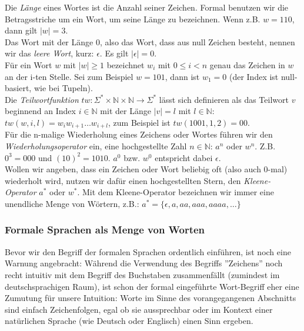 \noindent
Die \emph{Länge} eines Wortes ist die Anzahl seiner Zeichen.
Formal benutzen wir die Betragsstriche um ein Wort, um seine
Länge zu bezeichnen. Wenn z.B. $w = 110$, dann gilt $|w| = 3$.\\

\noindent
Das Wort mit der Länge 0, also das Wort, dass aus null Zeichen besteht,
nennen wir das \emph{leere Wort}, kurz: $\epsilon$.
Es gilt $|\epsilon| = 0$.\\

\noindent
Für ein Wort $w$ mit $|w| \geq 1$ bezeichnet $w_i$ mit $0 \leq i < n$
genau das Zeichen in $w$ an der i-ten Stelle.
Sei zum Beispiel $w = 101$, dann ist $w_1 = 0$
(der Index ist null-basiert, wie bei Tupeln).\\

\noindent
Die \emph{Teilwortfunktion}
$tw: \Sigma^* \times \mathbb{N} \times \mathbb{N} \rightarrow \Sigma^*$
lässt sich definieren als das Teilwort $v$ beginnend an Index $i \in \mathbb{N}$
mit der Länge $|v| = l$ mit $l \in \mathbb{N}$:
$tw(w, i, l) = w_iw_{i+1}\ldots{}w_{i+l}$,
zum Beispiel ist $tw(1001, 1, 2) = 00$.\\

\noindent
Für die n-malige Wiederholung eines Zeichens oder Wortes führen wir den \emph{Wiederholungsoperator}
ein, eine hochgestellte Zahl $n \in \mathbb{N}$: $a^n$ oder $w^n$.
Z.B. $0^3 = 000$ und $(10)^2 = 1010$.
$a^0$ bzw. $w^0$ entspricht dabei $\epsilon$.\\

\noindent
Wollen wir angeben, dass ein Zeichen oder Wort beliebig oft (also auch 0-mal) wiederholt
wird, nutzen wir dafür einen hochgestellten Stern, den \emph{Kleene-Operator} $a^*$ oder $w^*$.
Mit dem Kleene-Operator bezeichnen wir immer eine unendliche Menge von Wörtern, z.B.:
$a^* = \{\epsilon, a, aa, aaa, aaaa, \dots\}$

\subsubsection{Formale Sprachen als Menge von Worten}

Bevor wir den Begriff der formalen Sprachen ordentlich einführen,
ist noch eine Warnung angebracht:
Während die Verwendung des Begriffs ''Zeichens''
noch recht intuitiv mit dem Begriff des Buchstaben zusammenfällt
(zumindest im deutschsprachigen Raum),
ist schon der formal eingeführte Wort-Begriff eher eine Zumutung für unsere Intuition:
Worte im Sinne des vorangegangenen Abschnitts sind einfach Zeichenfolgen,
egal ob sie aussprechbar oder im Kontext einer natürlichen Sprache
(wie Deutsch oder Englisch) einen Sinn ergeben.

